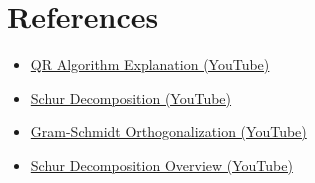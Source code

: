 \documentclass[12pt]{article}
\begin{document}
\section*{\textcolor{headercolor}{References}}
\begin{itemize}
    \item \href{https://youtu.be/d32WV1rKoVk?si=IUbFBid_FIf8_Jty}{QR Algorithm Explanation (YouTube)}
    \item \href{https://youtu.be/ItYveKoaBF8}{Schur Decomposition (YouTube)}
    \item \href{https://youtu.be/0MtwqhIwdrI}{Gram-Schmidt Orthogonalization (YouTube)}
    \item \href{https://youtu.be/mJNM4EYB-9s}{Schur Decomposition Overview  (YouTube)}
\end{itemize}
\end{document}

